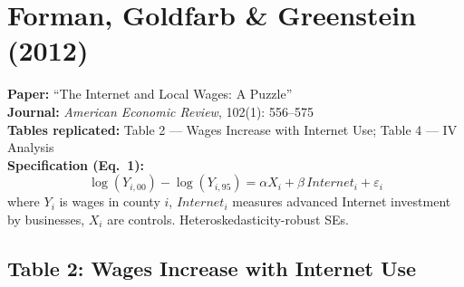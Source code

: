 \documentclass[11pt,a4paper]{article}
\begin{document}
\section{Forman, Goldfarb \& Greenstein (2012)}

\textbf{Paper:} ``The Internet and Local Wages: A Puzzle''\\
\textbf{Journal:} \textit{American Economic Review}, 102(1): 556--575\\
\textbf{Tables replicated:} Table 2 --- Wages Increase with Internet Use; Table 4 --- IV Analysis\\
\textbf{Specification (Eq.\ 1):}
\[
\log(Y_{i,00}) - \log(Y_{i,95}) = \alpha X_i + \beta\, Internet_i + \varepsilon_i
\]
where $Y_i$ is wages in county $i$, $Internet_i$ measures advanced Internet investment by businesses, $X_i$ are controls. Heteroskedasticity-robust SEs.

\vspace{0.3cm}
\noindent{}

\vspace{0.5cm}
\subsection*{Table 2: Wages Increase with Internet Use}
\end{document}
